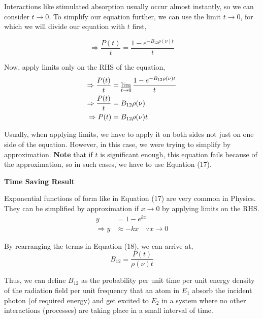 \documentclass[12pt]{article}
\begin{document}
Interactions like stimulated absorption usually occur almost instantly, so we can consider $t \rightarrow 0$. To simplify our equation further, we can use the limit $t \rightarrow 0$, for which we will divide our equation with $t$ first,

\begin{equation*}
    \Rightarrow \frac{P(t)}{t} = \frac{1 - e^{-B_{12}\rho(\nu)t}}{t}
\end{equation*} \vspace{.05cm}

Now, apply limits only on the RHS of the equation,
\begin{align}
    \Rightarrow \frac{P(t)}{t} &= \lim_{t \to 0} \frac{1 - e^{-B_{12}\rho(\nu)t}}{t} \notag \\
    \Rightarrow \frac{P(t)}{t} &= B_{12}\rho(\nu) \notag \\
    \Rightarrow P(t) &= B_{12}\rho(\nu)t
\end{align} 

Usually, when applying limits, we have to apply it on both sides not just on one side of the equation. However, in this case, we were trying to simplify by approximation. \textbf{Note} that if $t$ is significant enough, this equation fails because of the approximation, so in such cases, we have to use Equation (17). \vspace{.2cm}

\begin{note}
    \textbf{Time Saving Result} \vspace{.2cm}

    Exponential functions of form like in Equation (17) are very common in Physics. They can be simplified by approximation if $x \to 0$ by applying limits on the RHS.
    \begin{align*}
        y &= 1-e^{kx} \\
        \Rightarrow y & \approx -kx \quad \because x \to 0
    \end{align*}
\end{note}

By rearranging the terms in Equation (18), we can arrive at,
\begin{equation}
    B_{12} = \frac{P(t)}{\rho(\nu)t}
\end{equation}

Thus, we can define $B_{12}$ as the probability per unit time per unit energy density of the radiation field per unit frequency that an atom in $E_{1}$ absorb the incident photon (of required energy) and get excited to $E_{2}$ in a system where no other interactions (processes) are taking place in a small interval of time. \vspace{.2cm}
\end{document}
